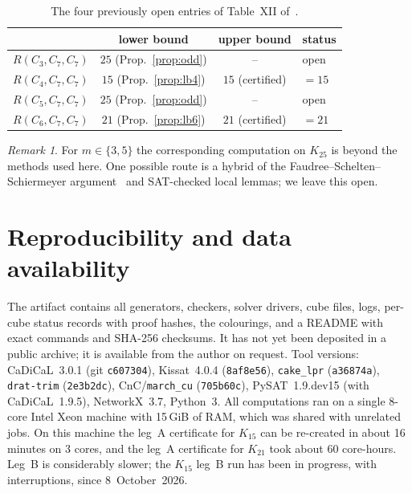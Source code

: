 \documentclass[11pt]{amsart}
\theoremstyle{definition}
\theoremstyle{remark}
\newtheorem{remark}[theorem]{Remark}
\begin{document}
\begin{table}[ht]
\caption{The four previously open entries of Table~XII of~\cite{Rad}.}\label{tab:results}
\begin{tabular}{lccl}
\toprule
 & lower bound & upper bound & status \\
\midrule
$R(C_3,C_7,C_7)$ & $25$ (Prop.~\ref{prop:odd}) & -- & open \\
$R(C_4,C_7,C_7)$ & $15$ (Prop.~\ref{prop:lb4}) & $15$ (certified) & $=15$ \\
$R(C_5,C_7,C_7)$ & $25$ (Prop.~\ref{prop:odd}) & -- & open \\
$R(C_6,C_7,C_7)$ & $21$ (Prop.~\ref{prop:lb6}) & $21$ (certified) & $=21$ \\
\bottomrule
\end{tabular}
\end{table}

\begin{remark}
For $m\in\{3,5\}$ the corresponding computation on $K_{25}$ is beyond the methods used here. One possible route is a hybrid of the
Faudree--Schelten--Schiermeyer argument~\cite{FSS3} and SAT-checked local lemmas; we leave this open.
\end{remark}

\section{Reproducibility and data availability}\label{sec:repro}
The artifact contains all generators, checkers, solver drivers, cube files, logs, per-cube status records with
proof hashes, the colourings, and a README with exact commands and SHA-256 checksums. It has not yet been deposited in a public
archive; it is available from the author on request. Tool versions: CaDiCaL~3.0.1 (git
\texttt{c607304}), Kissat~4.0.4 (\texttt{8af8e56}), \texttt{cake\_lpr} (\texttt{a36874a}), \texttt{drat-trim} (\texttt{2e3b2dc}),
CnC/\texttt{march\_cu} (\texttt{705b60c}), PySAT~1.9.dev15 (with CaDiCaL~1.9.5), NetworkX~3.7, Python~3. All computations ran on a single 8-core Intel Xeon machine
with 15\,GiB of RAM, which was shared with unrelated jobs. On this machine the leg~A certificate for $K_{15}$ can be re-created in
about 16 minutes on 3 cores, and the leg~A certificate for $K_{21}$ took about 60 core-hours. Leg~B is considerably slower;
the $K_{15}$ leg~B run has been in progress, with interruptions, since 8~October~2026.
\end{document}
